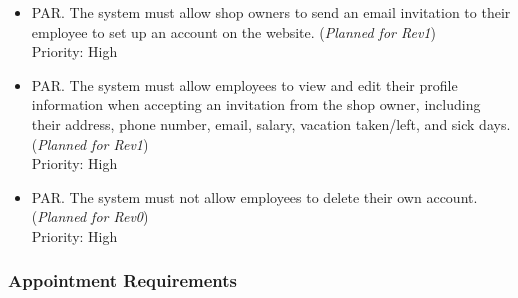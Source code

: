 \documentclass[12pt]{article}
\newcounter{parreqnum} %
\newcommand{\rev}[1]{(\textit{Planned for Rev#1})}
\begin{document}
\begin {itemize}
    
    \item[PAR\refstepcounter{parreqnum}\theparreqnum \label{R_Output}.] The system must allow shop owners to send an email invitation to their employee to set up an account on the website. \rev{1} \\
    Priority: High
    
    \item[PAR\refstepcounter{parreqnum}\theparreqnum \label{R_Output}.] The system must allow employees to view and edit their profile information when accepting an invitation from the shop owner, including their address, phone number, email, salary, vacation taken/left, and sick days. \rev{1} \\
    Priority: High

    \item[PAR\refstepcounter{parreqnum}\theparreqnum \label{R_Output}.] The system must not allow employees to delete their own account. \rev{0} \\
    Priority: High
    
\end {itemize}

\subsubsection{Appointment Requirements}
\end{document}
